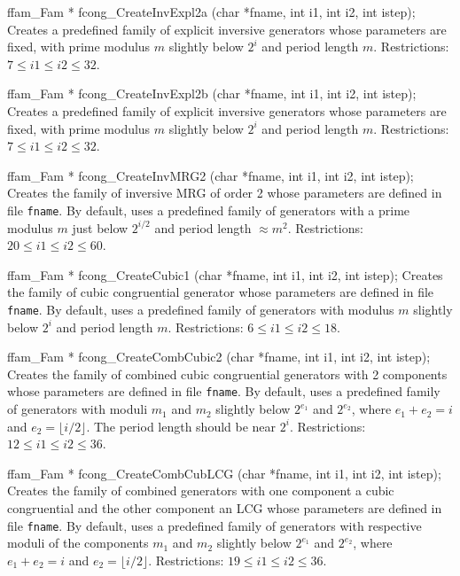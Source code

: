 ffam_Fam * fcong_CreateInvExpl2a (char *fname, int i1, int i2, int istep);
\endcode
\tab
 Creates a predefined family of explicit inversive generators whose
 parameters are fixed, with prime modulus $m$
 slightly below $2^i$ and period length $m$.
 Restrictions: $7 \le i1 \le i2 \le 32$.
\endtab
\code


ffam_Fam * fcong_CreateInvExpl2b (char *fname, int i1, int i2, int istep);
\endcode
\tab
 Creates a predefined family of explicit inversive generators whose
 parameters are fixed, with prime modulus $m$
 slightly below $2^i$ and period length $m$.
 Restrictions: $7 \le i1 \le i2 \le 32$.
\endtab
\code


ffam_Fam * fcong_CreateInvMRG2 (char *fname, int i1, int i2, int istep);
\endcode
\tab
 Creates the family of inversive MRG of order 2 whose
 parameters are defined in  file {\tt fname}. By default, uses
 a predefined family of generators with a prime modulus $m$
 just below $2^{i/2}$ and period length $\approx m^2$. 
 Restrictions: $ 20 \le i1 \le i2 \le 60$.
\endtab
\code


ffam_Fam * fcong_CreateCubic1 (char *fname, int i1, int i2, int istep);
\endcode
\tab
 Creates the family of cubic congruential generator whose
 parameters are defined in  file {\tt fname}. By default, uses
 a predefined family of generators with modulus $m$
 slightly below $2^i$ and period length $m$.
 Restrictions: $6 \le i1 \le i2 \le 18$.
\endtab
\code


ffam_Fam * fcong_CreateCombCubic2 (char *fname, int i1, int i2, int istep);
\endcode
\tab
 Creates the family of combined cubic congruential generators with 2
 components whose parameters are defined in  file {\tt fname}. By default,
 uses a predefined family of generators with moduli $m_1$ and $m_2$
 slightly below $2^{e_1}$ and $2^{e_2}$, where $e_1 + e_2 = i$ and
 $e_2 = \lfloor i/2\rfloor$. The period length should be near $2^i$.
 Restrictions: $12 \le i1 \le i2 \le 36$.
\endtab
\code


ffam_Fam * fcong_CreateCombCubLCG (char *fname, int i1, int i2, int istep);
\endcode
\tab
 Creates the family of combined generators with one component a cubic 
 congruential and the other component an LCG whose parameters are defined
 in file {\tt fname}. By default, uses a predefined family of generators
 with respective moduli of the components $m_1$ and $m_2$ slightly below
 $2^{e_1}$ and $2^{e_2}$, where $e_1 + e_2 = i$ and $e_2 = \lfloor i/2\rfloor$.
 Restrictions: $19 \le i1 \le i2 \le 36$.
\endtab




